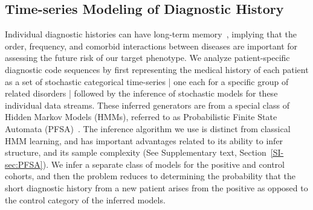 \documentclass[3p,super,numbers,sort&compress,preprint,10pt]{elsarticle}
\def\treatment{positive\xspace}
\begin{document}
\subsection*{Time-series Modeling of  Diagnostic History}
Individual diagnostic histories  can have long-term memory~\cite{ltgranger80}, implying that the order, frequency, and comorbid interactions between diseases are   important for assessing the future risk of our target phenotype. 
We analyze  patient-specific  diagnostic code sequences by first  representing the medical history of each patient as a set of stochastic categorical time-series | one each for a specific group of related disorders |  followed by the inference of stochastic models  for  these individual data streams. These inferred generators are from a special class of  Hidden Markov Models (HMMs), referred to as Probabilistic Finite State Automata (PFSA)~\cite{CL12g}. The inference algorithm we use is distinct from classical HMM learning, and has important advantages related to its ability to infer structure, and its sample complexity (See Supplementary text, Section~\ref{SI-sec:PFSA}). We infer a separate class of models for the \treatment and control cohorts, and then the problem reduces to determining the probability that the short diagnostic history from a  new  patient arises from the \treatment as opposed to the control category of the inferred models. %


 
\end{document}
